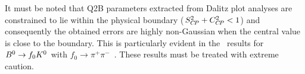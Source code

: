 It must be noted that Q2B parameters extracted from Dalitz plot analyses 
are constrained to lie within the physical boundary ($S_{C\!P}^2 + C_{C\!P}^2 < 1$)
and consequently the obtained errors are highly non-Gaussian when
the central value is close to the boundary.  
This is particularly evident in the \babar\ results for 
$B^0 \to f_0K^0$ with $f_0 \to \pi^+\pi^-$~\cite{Aubert:2009me}.
These results must be treated with extreme caution.

\begin{figure}[htb]
  \begin{center}
    \hfill
    \resizebox{0.45\textwidth}{!}{
}
\end{center}
\end{figure}
